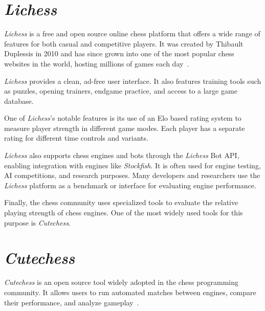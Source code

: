 \section{\textit{Lichess}}\label{sec:lichess}

\textit{Lichess} is a free and open source online chess platform that offers a wide range of features for both casual and competitive players. It was created by Thibault Duplessis in 2010 and has since grown into one of the most popular chess websites in the world, hosting millions of games each day~\cite{Lichess}.

\vspace{1em}

\noindent \textit{Lichess} provides a clean, ad-free user interface. It also features training tools such as puzzles, opening trainers, endgame practice, and access to a large game database.

\vspace{1em}

\noindent One of \textit{Lichess}'s notable features is its use of an Elo based rating system to measure player strength in different game modes. Each player has a separate rating for different time controls and variants.

\vspace{1em}

\noindent \textit{Lichess} also supports chess engines and bots through the \textit{Lichess} Bot API, enabling integration with engines like \textit{Stockfish}. It is often used for engine testing, AI competitions, and research purposes. Many developers and researchers use the \textit{Lichess} platform as a benchmark or interface for evaluating engine performance.

\vspace{1em}

\noindent Finally, the chess community uses specialized tools to evaluate the relative playing strength of chess engines. One of the most widely used tools for this purpose is \textit{Cutechess}.

\section{\textit{Cutechess}}\label{sec:cutechess}

\noindent \textit{Cutechess} is an open source tool widely adopted in the chess programming community. It allows users to run automated matches between engines, compare their performance, and analyze gameplay~\cite{CuteChess}.

